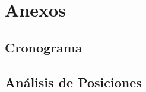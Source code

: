 \chapter{Anexos}
\section{Cronograma}
\label{Anexo:CronogramaCompleto}


\section{Análisis de Posiciones}
\label{Anexo:AnalisisdePosiciones}